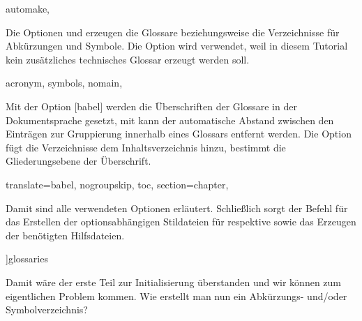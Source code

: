 \documentclass[%
  english,ngerman,%
  geometry=no,DIV=12,automark,%
]{tudscrartcl}
\begin{document}
%
\begin{Preamble}
  automake,%
\end{Preamble}
%
Die Optionen  und  erzeugen die Glossare 
beziehungsweise die Verzeichnisse für Abkürzungen und Symbole. Die Option  
 wird verwendet, weil in diesem Tutorial kein zusätzliches 
technisches Glossar erzeugt werden soll.
%
\begin{Preamble}
  acronym,%
  symbols,%
  nomain,%
\end{Preamble}
%
Mit der Option [babel] werden die Überschriften der Glossare 
in der Dokumentsprache gesetzt, mit  kann der automatische 
Abstand zwischen den Einträgen zur Gruppierung innerhalb eines Glossars 
entfernt werden. Die Option  fügt die Verzeichnisse dem 
Inhaltsverzeichnis hinzu,  bestimmt die Gliederungsebene der 
Überschrift.
%
\begin{Preamble}
  translate=babel,%
  nogroupskip,%
  toc,%
  section=chapter,%
\end{Preamble}
%
Damit sind alle verwendeten Optionen erläutert. Schließlich sorgt der Befehl 
 für das Erstellen der optionsabhängigen Stildateien für 
 respektive  sowie das Erzeugen der 
benötigten Hilfsdateien.
%
\begin{Preamble}
]{glossaries}
\makeglossaries

\end{Preamble}
%
Damit wäre der erste Teil zur Initialisierung überstanden und wir können zum 
eigentlichen Problem kommen. Wie erstellt man nun ein Abkürzungs- und/oder 
Symbolverzeichnis?
\end{document}

